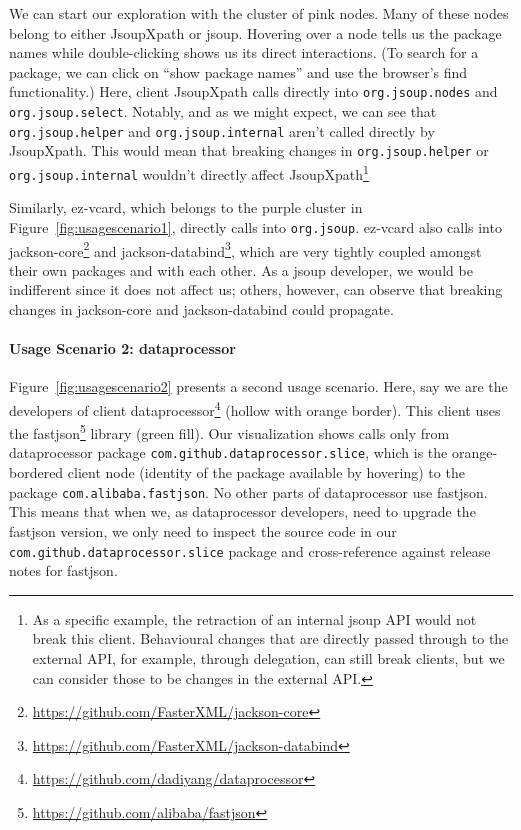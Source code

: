 We can start our exploration with the cluster of pink nodes. Many of these nodes belong to either JsoupXpath or jsoup. Hovering over a node tells us the package names while double-clicking shows us its direct interactions. (To search for a package, we can click on ``show package names'' and use the browser's find functionality.) Here, client JsoupXpath calls directly into \texttt{org.jsoup.nodes} and \texttt{org.jsoup.select}. Notably, and as we might expect, we can see that \texttt{org.jsoup.helper} and \texttt{org.jsoup.internal} aren't called directly by JsoupXpath. This would mean that breaking changes in \texttt{org.jsoup.helper} or \texttt{org.jsoup.internal} wouldn't directly affect JsoupXpath\footnote{As a specific example, the retraction of an internal jsoup API would not break this client. Behavioural changes that are directly passed through to the external API, for example, through delegation, can still break clients, but we can consider those to be changes in the external API.} 

Similarly, ez-vcard, which belongs to the purple cluster in Figure~\ref{fig:usagescenario1}, directly calls into \texttt{org.jsoup}. ez-vcard also calls into jackson-core\footnote{\url{https://github.com/FasterXML/jackson-core}\label{jackson-core}} and jackson-databind\footnote{\url{https://github.com/FasterXML/jackson-databind}\label{jackson-databind}}, which are very tightly coupled amongst their own packages and with each other. As a jsoup developer, we would be indifferent since it does not affect us; others, however, can observe that breaking changes in jackson-core and jackson-databind could propagate.

\paragraph{Usage Scenario 2: dataprocessor}

Figure~\ref{fig:usagescenario2} presents a second usage scenario. Here, say we are the developers of client dataprocessor\footnote{\url{https://github.com/dadiyang/dataprocessor}\label{dataprocessor}} (hollow with orange border). This client uses the fastjson\footnote{\url{https://github.com/alibaba/fastjson}\label{fastjson}} library (green fill). Our visualization shows calls only from dataprocessor package \texttt{com.github.dataprocessor.slice}, which is the orange-bordered client node (identity of the package available by hovering) to the package \texttt{com.alibaba.fastjson}. No other parts of dataprocessor use fastjson. This means that when we, as dataprocessor developers, need to upgrade the fastjson version, we only need to inspect the source code in our \texttt{com.github.dataprocessor.slice} package and cross-reference against release notes for fastjson. 

